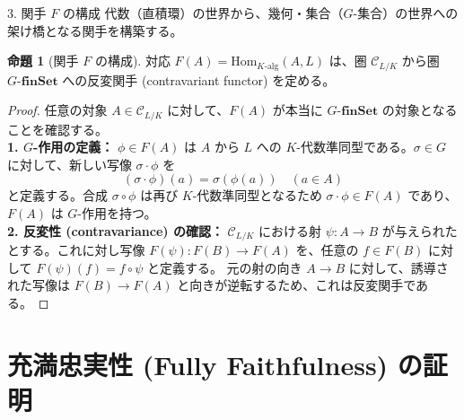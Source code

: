 \documentclass[10pt, unicode]{beamer}
\theoremstyle{definition}
\newtheorem{prop}[thm]{命題}
\begin{document}
\begin{frame}[allowframebreaks]{3. 関手 $F$ の構成}
    代数（直積環）の世界から、幾何・集合（$G$-集合）の世界への架け橋となる関手を構築する。

    \begin{prop}[関手 $F$ の構成]
        対応 $F(A) = \mathrm{Hom}_{K\text{-alg}}(A, L)$ は、圏 $\mathcal{C}_{L/K}$ から圏 $G\text{-}\mathbf{finSet}$ への反変関手 (contravariant functor) を定める。
    \end{prop}

    \begin{proof}
        任意の対象 $A \in \mathcal{C}_{L/K}$ に対して、$F(A)$ が本当に $G\text{-}\mathbf{finSet}$ の対象となることを確認する。\\
        \textbf{1. $G$-作用の定義：} $\phi \in F(A)$ は $A$ から $L$ への $K$-代数準同型である。$\sigma \in G$ に対して、新しい写像 $\sigma \cdot \phi$ を
        \[ (\sigma \cdot \phi)(a) = \sigma(\phi(a)) \quad (a \in A) \]
        と定義する。合成 $\sigma \circ \phi$ は再び $K$-代数準同型となるため $\sigma \cdot \phi \in F(A)$ であり、$F(A)$ は $G$-作用を持つ。\\
        \textbf{2. 反変性 (contravariance) の確認：} $\mathcal{C}_{L/K}$ における射 $\psi: A \to B$ が与えられたとする。これに対し写像 $F(\psi): F(B) \to F(A)$ を、任意の $f \in F(B)$ に対して $F(\psi)(f) = f \circ \psi$ と定義する。
        元の射の向き $A \to B$ に対して、誘導された写像は $F(B) \to F(A)$ と向きが逆転するため、これは反変関手である。
    \end{proof}
\end{frame}

\section{充満忠実性 (Fully Faithfulness) の証明}
\end{document}
